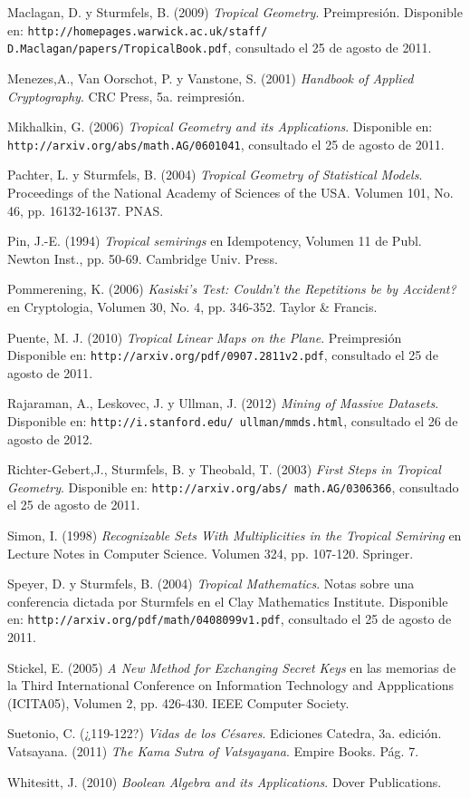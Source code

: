 \documentclass[spanish,12pt,twoside]{book}
\newcommand{\ttt}[1]{\texttt{#1}}
\theoremstyle{definition}
\begin{document}
\begin{thebibliography}{50}
		 Maclagan, D. y Sturmfels, B. (2009) \emph{Tropical Geometry}. Preimpresión. Disponible en:  \ttt{http://homepages.warwick.ac.uk/staff/ D.Maclagan/papers/TropicalBook.pdf}, consultado el 25 de agosto de 2011.

		 Menezes,A., Van Oorschot, P. y Vanstone, S. (2001) \emph{Handbook of Applied Cryptography}. CRC Press, 5a. reimpresión.
				
		 Mikhalkin, G. (2006) \emph{Tropical Geometry and its Applications}. Disponible en:  \ttt{http://arxiv.org/abs/math.AG/0601041}, consultado el 25 de agosto de 2011.
						
		 Pachter, L. y Sturmfels, B. (2004) \emph{Tropical Geometry of Statistical Models}.
Proceedings of the National Academy of Sciences of the USA. Volumen 101, No. 46, pp. 16132-16137. PNAS.

 		 Pin, J.-E. (1994) \emph{Tropical semirings} en Idempotency, Volumen 11 de Publ. Newton Inst., pp. 50-69. Cambridge Univ. Press.

 		 Pommerening, K. (2006) \emph{Kasiski's Test: Couldn't the Repetitions be by Accident?} en Cryptologia, Volumen 30, No. 4, pp. 346-352. Taylor \& Francis.%

 		 Puente, M. J. (2010) \emph{Tropical Linear Maps on the Plane}. Preimpresión  Disponible en:  \ttt{http://arxiv.org/pdf/0907.2811v2.pdf}, consultado el 25 de agosto de 2011.

 		 Rajaraman, A., Leskovec, J. y Ullman, J. (2012) \emph{Mining of Massive Datasets}. Disponible en:  \ttt{http://i.stanford.edu/~ullman/mmds.html}, consultado el 26 de agosto de 2012.

		 Richter-Gebert,J., Sturmfels, B. y Theobald, T. (2003) \emph{First Steps in Tropical Geometry}. Disponible en:  \ttt{http://arxiv.org/abs/ math.AG/0306366}, consultado el 25 de agosto de 2011.
		
		 Simon, I. (1998) \emph{Recognizable Sets With Multiplicities in the Tropical Semiring} en Lecture Notes in Computer Science. Volumen 324, pp. 107-120. Springer.

		 Speyer, D. y Sturmfels, B. (2004) \emph{Tropical Mathematics}. Notas sobre una conferencia dictada por Sturmfels en el Clay Mathematics Institute. Disponible en:  \ttt{http://arxiv.org/pdf/math/0408099v1.pdf}, consultado el 25 de agosto de 2011.

 		 Stickel, E. (2005) \emph{A New Method for Exchanging Secret Keys} en las memorias de la Third International Conference on Information Technology and Appplications (ICITA05), Vo\-lu\-men 2, pp. 426-430. IEEE Computer Society.%

		 Suetonio, C. (¿119-122?) \emph{Vidas de los Césares}. Ediciones Catedra, 3a. edición. %
		 Vatsayana. (2011) \emph{The Kama Sutra of Vatsyayana}. Empire Books. Pág. 7.

		 Whitesitt, J. (2010) \emph{Boolean Algebra and its Applications}. Dover Publications.
\end{thebibliography}
\end{document}
